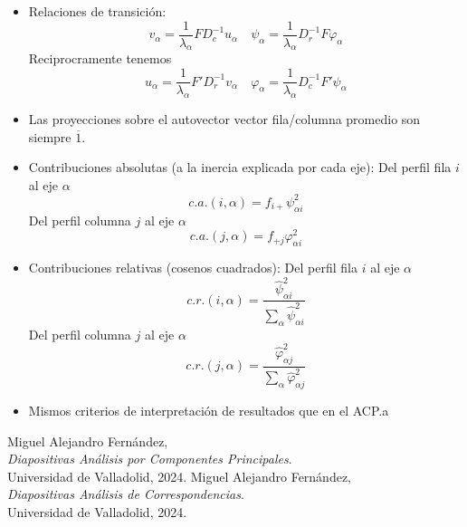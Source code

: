 \documentclass{article}
\begin{document}
\begin{itemize}
\begin{itemize}
          \end{itemize}
    \item Relaciones de transición: \[v_\alpha=\frac{1}{\lambda_\alpha}FD_c^{-1}u_\alpha \quad \psi_\alpha=\frac{1}{\lambda_\alpha}D_r^{-1}F\varphi_\alpha\] Reciprocramente tenemos \[u_\alpha=\frac{1}{\lambda_\alpha}F'D_r^{-1}v_\alpha \quad \varphi_\alpha=\frac{1}{\lambda_\alpha}D_c^{-1}F'\psi_\alpha\]
    \item Las proyecciones sobre el autovector vector fila/columna promedio son siempre $\overline{1}$.
    \item Contribuciones absolutas (a la inercia explicada por cada eje): Del perfil fila $i$ al eje $\alpha$ \[c.a.(i,\alpha)=f_{i+}\psi^2_{\alpha i}\] Del perfil columna $j$ al eje $\alpha$ \[c.a.(j,\alpha)=f_{+j}\varphi^2_{\alpha i}\]
    \item Contribuciones relativas (cosenos cuadrados): Del perfil fila $i$ al eje $\alpha$ \[c.r.(i,\alpha)=\frac{\hat{\psi}^2_{\alpha i}}{\sum_{\alpha}\hat{\psi}^2_{\alpha i}}\] Del perfil columna $j$ al eje $\alpha$ \[c.r.(j,\alpha)=\frac{\hat{\varphi}^2_{\alpha j}}{\sum_{\alpha}\hat{\varphi}^2_{\alpha j}}\]
    \item Mismos criterios de interpretación de resultados que en el ACP.a
\end{itemize}

\newpage


\begin{thebibliography}{9}
    Miguel Alejandro Fernández, \\ \textit{Diapositivas Análisis por Componentes Principales}. \\ Universidad de Valladolid, 2024.
    Miguel Alejandro Fernández, \\ \textit{Diapositivas Análisis de Correspondencias}. \\ Universidad de Valladolid, 2024.
\end{thebibliography}

% 
% 

\end{document}

